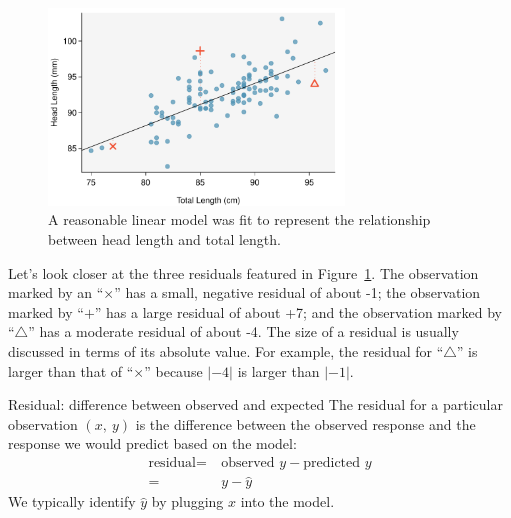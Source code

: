 \begin{figure}[h]
   \centering
   \includegraphics[width=0.7\textwidth]{ch_regr_simple_linear/figures/scattHeadLTotalLLine/scattHeadLTotalLLine}
   \caption{A reasonable linear model was fit to represent the relationship between head length and total length.}
   \label{scattHeadLTotalLLine}
\end{figure}

Let's look closer at the three residuals featured in Figure~\ref{scattHeadLTotalLLine}.  The observation marked by an ``$\times$'' has a small, negative residual of about -1; the observation marked by ``$+$'' has a large residual of about +7; and the observation marked by ``$\triangle$'' has a moderate residual of about -4. The size of a residual is usually discussed in terms of its absolute value. For example, the residual for ``$\triangle$'' is larger than that of ``$\times$'' because $|-4|$ is larger than $|-1|$.




\begin{onebox}{Residual: difference between observed and expected}
The residual for a particular observation $(x, \ y)$ is the difference between the observed response and the response we would predict based on the model:
\begin{align*}
\text{residual} =& \ \text{observed } y - \text{predicted } y\\
 =&\  y - \hat{y}
\end{align*}
We typically identify $\hat{y}$ by plugging $x$ into the model.\end{onebox}

